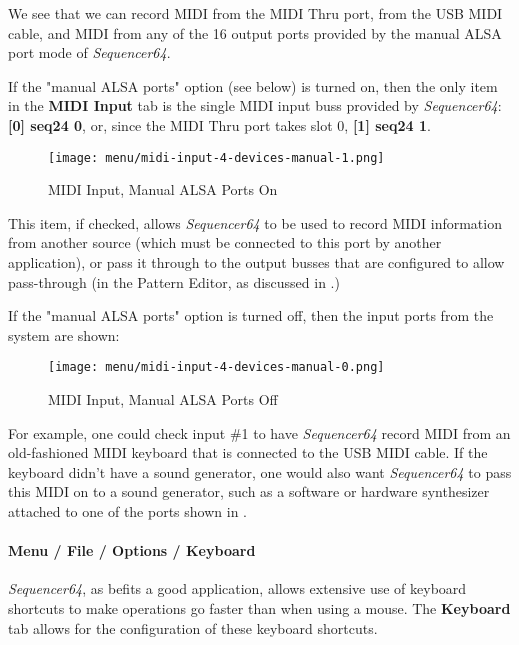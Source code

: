    We see that we can record MIDI from the MIDI Thru port, from the USB MIDI
   cable, and MIDI from any of the 16 output ports provided by the manual ALSA
   port mode of \textsl{Sequencer64}.

   If the "manual ALSA ports" option (see below) is turned on,
   then the only item in the \textbf{MIDI Input} tab is the single MIDI input
   buss provided by \textsl{Sequencer64}:  \textbf{[0] seq24 0}, or, since
   the MIDI Thru port takes slot 0, \textbf{[1] seq24 1}.

\begin{figure}[H]
   \centering 
   \texttt{[image: menu/midi-input-4-devices-manual-1.png]}
   \caption{MIDI Input, Manual ALSA Ports On}
   \label{fig:seq64_midi_input_4_devices_manual_1}
\end{figure}

   This item, if checked, allows \textsl{Sequencer64} to be used to record MIDI
   information from another source (which must be connected to this port by
   another application), or pass it through to the output busses
   that are configured to allow pass-through
   (in the Pattern Editor, as discussed in 
   .)

   If the "manual ALSA ports" option is turned off, then
   the input ports from the system are shown:

\begin{figure}[H]
   \centering 
   \texttt{[image: menu/midi-input-4-devices-manual-0.png]}
   \caption{MIDI Input, Manual ALSA Ports Off}
   \label{fig:seq64_midi_input_4_devices_manual_0}
\end{figure}

   For example, one could check input \#1 to have \textsl{Sequencer64} record
   MIDI from an old-fashioned MIDI keyboard that is connected to the USB MIDI
   cable.  If the keyboard didn't have a sound generator, one would also want
   \textsl{Sequencer64} to pass this MIDI on to a sound generator, such as a
   software or hardware synthesizer attached to one of the ports shown in
   .

\paragraph{Menu / File / Options / Keyboard }
\label{paragraph:seq64_menu_file_options_keyboard}

   \textsl{Sequencer64}, as befits a good application, allows extensive use of
   keyboard shortcuts to make operations go faster than when using a mouse.
   The \textbf{Keyboard} tab allows for the configuration of these keyboard
   shortcuts.

